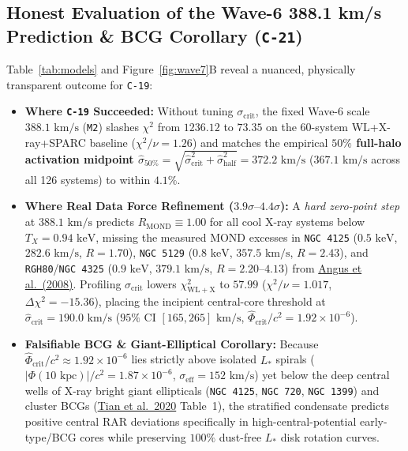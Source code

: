\documentclass[11pt,a4paper]{article}
\begin{document}
\subsection{Honest Evaluation of the Wave-6 388.1 km/s Prediction \& BCG Corollary (\texttt{C-21})}
Table~\ref{tab:models} and Figure~\ref{fig:wave7}B reveal a nuanced, physically transparent outcome for \texttt{C-19}:
\begin{itemize}\setlength{\itemsep}{2pt}
  \item \textbf{Where \texttt{C-19} Succeeded:} Without tuning $\sigma_{\mathrm{crit}}$, the fixed Wave-6 scale $388.1\text{ km/s}$ (\texttt{M2}) slashes $\chi^2$ from $1236.12$ to $73.35$ on the 60-system WL+X-ray+SPARC baseline ($\chi^2/\nu = 1.26$) and matches the empirical \textbf{$50\%$ full-halo activation midpoint $\hat{\sigma}_{50\%} = \sqrt{\hat{\sigma}_{\mathrm{crit}}^2 + \hat{\sigma}_{\mathrm{half}}^2} = 372.2\text{ km/s}$} ($367.1\text{ km/s}$ across all 126 systems) to within \textbf{$4.1\%$}.
  \item \textbf{Where Real Data Force Refinement ($3.9\sigma\text{--}4.4\sigma$):} A \textit{hard zero-point step} at $388.1\text{ km/s}$ predicts $R_{\mathrm{MOND}} \equiv 1.00$ for all cool X-ray systems below $T_X = 0.94\text{ keV}$, missing the measured MOND excesses in \texttt{NGC 4125} ($0.5\text{ keV}$, $282.6\text{ km/s}$, $R = 1.70$), \texttt{NGC 5129} ($0.8\text{ keV}$, $357.5\text{ km/s}$, $R = 2.43$), and \texttt{RGH80}/\texttt{NGC 4325} ($0.9\text{ keV}$, $379.1\text{ km/s}$, $R = 2.20\text{--}4.13$) from \href{https://arxiv.org/html/0709.0108v3}{Angus et al.\ (2008)}. Profiling $\sigma_{\mathrm{crit}}$ lowers $\chi^2_{\mathrm{WL+X}}$ to $57.99$ ($\chi^2/\nu = 1.017$, $\Delta\chi^2 = -15.36$), placing the incipient central-core threshold at $\hat{\sigma}_{\mathrm{crit}} = 190.0\text{ km/s}$ ($95\%$ CI $[165, 265]\text{ km/s}$, $\hat{\Phi}_{\mathrm{crit}}/c^2 = 1.92\times 10^{-6}$).
  \item \textbf{Falsifiable BCG \& Giant-Elliptical Corollary:} Because $\hat{\Phi}_{\mathrm{crit}}/c^2 \approx 1.92\times 10^{-6}$ lies strictly above isolated $L_*$ spirals ($|\Phi(10\text{ kpc})|/c^2 = 1.87\times 10^{-6}$, $\sigma_{\mathrm{eff}} = 152\text{ km/s}$) yet below the deep central wells of X-ray bright giant ellipticals (\texttt{NGC 4125}, \texttt{NGC 720}, \texttt{NGC 1399}) and cluster BCGs (\href{https://arxiv.org/html/2001.08340v2}{Tian et al.\ 2020} Table~1), the stratified condensate predicts positive central RAR deviations specifically in high-central-potential early-type/BCG cores while preserving $100\%$ dust-free $L_*$ disk rotation curves.
\end{itemize}
\end{document}
